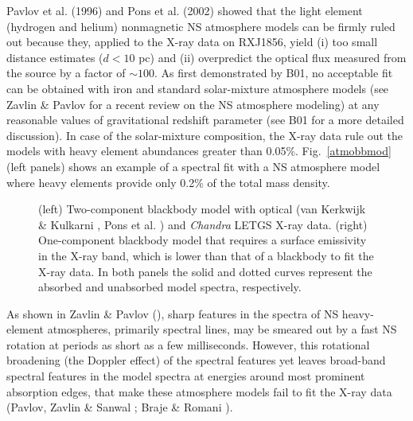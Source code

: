 \documentclass[twocolumn]{aa}
\newcommand{\modi}[1]{{#1}}
\begin{document}
Pavlov et al. (1996) and Pons et al. (2002) showed that 
the light element (hydrogen and helium) nonmagnetic NS atmosphere models 
can be firmly ruled out because they, applied to 
the X-ray data on RXJ1856, yield (i) too small distance estimates ($d<10$ pc)
and (ii)
overpredict the optical flux measured from the source by a factor of 
$\sim 100$. 
As first demonstrated by B01,
no acceptable fit can be obtained with iron and
standard solar-mixture atmosphere models 
(see Zavlin \& Pavlov \cite{ZavPav02} for a recent review on 
the NS atmosphere modeling)
at any reasonable values of gravitational redshift parameter
(see B01 for a more detailed discussion). 
In case of the solar-mixture composition, the X-ray data rule
out the models with heavy element abundances greater than 0.05\%.
\modi{Fig.~\ref{atmobbmod} (left panels)} shows an example of a spectral fit with
a NS atmosphere model where heavy elements provide only
0.2\% of the total mass density. 
%
%
\begin{figure}
   \centerline{} 
   \caption{\modi{(left) Two-component blackbody model with optical 
    (van Kerkwijk \& Kulkarni \cite{KerKul01}, Pons et al. \cite{Ponetal02})
    and {\em Chandra} LETGS X-ray data.  
(right) One-component blackbody model that requires a 
    surface emissivity in the X-ray band, which is lower than that 
    of a blackbody to fit the X-ray data. 
In both panels the solid and dotted curves represent the absorbed 
and unabsorbed model spectra, respectively.}
\label{overallbb} }	      
\end{figure}

As shown in Zavlin \& Pavlov (\cite{ZavPav02}), sharp 
features in the spectra of NS heavy-element atmospheres, 
primarily spectral lines, may be smeared out by a fast 
NS rotation at periods as short as a few milliseconds.
However, this rotational broadening (the Doppler effect)
of the spectral features yet leaves  broad-band spectral
features in the model spectra at energies around most 
prominent absorption edges, that make these atmosphere 
models fail to fit the X-ray data (Pavlov, Zavlin \& Sanwal 
\cite{PavZavSan02}; Braje \& Romani \cite{BraRom02}). 
\end{document}
